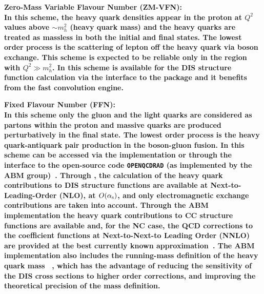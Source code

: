 \begin{description}
\item \bf{Zero-Mass Variable Flavour Number (ZM-VFN)}\rm \cite{ZMVFNpub}:
\\
In this scheme, the
heavy quark densities appear in the proton at $Q^2$ values above $\sim m_h^2$ (heavy quark mass)
and the heavy quarks
are treated as massless in both the initial 
and final states. The lowest order process is the
scattering of lepton off the heavy quark via boson exchange.
This scheme is expected to be reliable only in the region with $Q^2 \gg m_h^2$.
In \fitter this scheme is available for the DIS structure function calculation 
via the interface to the \qcdnum \cite{qcdnum} package and it benefits 
from the fast \qcdnum convolution engine.

\item \bf {Fixed Flavour Number (FFN)}\rm \cite{Laenen:1992, Laenen:1993, Riem:1995}: 
\\
In this scheme only the gluon and the light quarks are considered
as partons within the proton and massive 
quarks are produced perturbatively in the final state.
The lowest order process is
the heavy quark-antiquark pair production in the boson-gluon fusion.
In \fitter this scheme can be accessed via the 
\qcdnum implementation or through the interface to the open-source code \texttt{OPENQCDRAD} (as implemented by the ABM group)~\cite{openqcdrad:page}.
Through \qcdnum, the calculation of the heavy quark contributions to DIS structure functions
are available at Next-to-Leading-Order (NLO), at $O(\alpha_\mathrm{s})$, and only electromagnetic exchange contributions are taken into account.
Through the ABM implementation the heavy quark contributions to CC structure functions are available 
and, for the NC case, the QCD corrections to the coefficient functions at Next-to-Next-to Leading Order (NNLO)
are provided at the best currently known approximation~\cite{SMoch:npb864}.
The ABM implementation also includes the running-mass definition of the heavy quark 
mass ~\cite{Alekhin:runm}, which 
has the advantage of reducing the sensitivity of the DIS cross sections to
higher order corrections, and improving the theoretical precision of the mass definition. 



\end{description}
